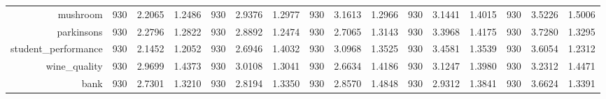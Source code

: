 \begin{table}[htbp]
{\begin{tabular}{rccccccccccccccc}
			mushroom                            & 930                                   & \cellcolor[rgb]{ .776,  .937,  .808}\textcolor[rgb]{ 0,  .38,  0}{2.2065}          & 1.2486          & 930            & 2.9376                                                                    & 1.2977          & 930            & 3.1613                                                                    & 1.2966          & 930            & 3.1441                                                                    & 1.4015          & 930            & 3.5226          & 1.5006          \\
			parkinsons                          & 930                                   & \cellcolor[rgb]{ .776,  .937,  .808}\textcolor[rgb]{ 0,  .38,  0}{2.2796}          & 1.2822          & 930            & 2.8892                                                                    & 1.2474          & 930            & 2.7065                                                                    & 1.3143          & 930            & 3.3968                                                                    & 1.4175          & 930            & 3.7280          & 1.3295          \\
			student\_performance                & 930                                   & \cellcolor[rgb]{ .776,  .937,  .808}\textcolor[rgb]{ 0,  .38,  0}{2.1452}          & 1.2052          & 930            & 2.6946                                                                    & 1.4032          & 930            & 3.0968                                                                    & 1.3525          & 930            & 3.4581                                                                    & 1.3539          & 930            & 3.6054          & 1.2312          \\
			wine\_quality                       & 930                                   & 2.9699                                                                             & 1.4373          & 930            & 3.0108                                                                    & 1.3041          & 930            & \cellcolor[rgb]{ .776,  .937,  .808}\textcolor[rgb]{ 0,  .38,  0}{2.6634} & 1.4186          & 930            & 3.1247                                                                    & 1.3980          & 930            & 3.2312          & 1.4471          \\
			bank                                & 930                                   & 2.7301                                                                             & 1.3210          & 930            & 2.8194                                                                    & 1.3350          & 930            & 2.8570                                                                    & 1.4848          & 930            & 2.9312                                                                    & 1.3841          & 930            & 3.6624          & 1.3391          \\

\end{tabular}}
\end{table}
